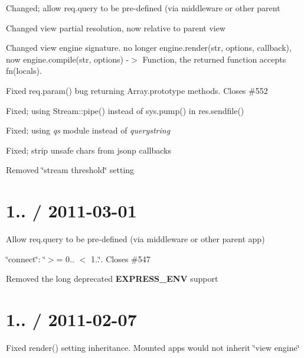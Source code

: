 {\begin{DoxyItemize}
\item Changed; allow {\ttfamily req.\+query} to be pre-\/defined (via middleware or other parent
\item Changed view partial resolution, now relative to parent view
\item Changed view engine signature. no longer {\ttfamily engine.\+render(str, options, callback)}, now {\ttfamily engine.\+compile(str, options) -\/$>$ Function}, the returned function accepts {\ttfamily fn(locals)}.
\item Fixed {\ttfamily req.\+param()} bug returning Array.\+prototype methods. Closes \#552
\item Fixed; using {\ttfamily Stream\+::pipe()} instead of {\ttfamily sys.\+pump()} in {\ttfamily res.\+sendfile()}
\item Fixed; using {\itshape qs} module instead of {\itshape querystring}
\item Fixed; strip unsafe chars from jsonp callbacks
\item Removed \char`\"{}stream threshold\char`\"{} setting
\end{DoxyItemize}}

{\ttfamily \section*{1.. / 2011-\/03-\/01 }}

{\ttfamily }

{\ttfamily 
\begin{DoxyItemize}
\item Allow {\ttfamily req.\+query} to be pre-\/defined (via middleware or other parent app)
\item \char`\"{}connect\char`\"{}\+: \char`\"{}$>$= 0.. $<$ 1..\char`\"{}. Closes \#547
\item Removed the long deprecated {\bfseries E\+X\+P\+R\+E\+S\+S\+\_\+\+E\+NV} support
\end{DoxyItemize}}

{\ttfamily \section*{1.. / 2011-\/02-\/07 }}

{\ttfamily }

{\ttfamily 
\begin{DoxyItemize}
\item Fixed {\ttfamily render()} setting inheritance. Mounted apps would not inherit \char`\"{}view engine\char`\"{}
\end{DoxyItemize}}

